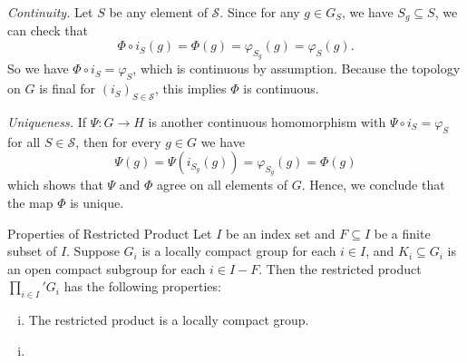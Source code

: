 \documentclass{report}
\begin{document}
\begin{prf}
\emph{Continuity.}
Let $S$ be any element of $\mathcal{S}$. Since for any $g\in G_{S}$, we have $S_g\subseteq S$, we can check that
\[
\Phi\circ i_S(g)=\Phi(g)=\varphi_{S_g}(g)=\varphi_S(g).
\]
So we have $\Phi\circ i_S=\varphi_S$, which is continuous by assumption. Because the topology on $G$ is final for $(i_S)_{S\in \mathcal{S}}$, this implies
$\Phi$ is continuous.

\emph{Uniqueness.}
If $\Psi\colon G\to H$ is another continuous homomorphism with
$\Psi\circ i_S=\varphi_S$ for all $S\in\mathcal{S}$, then for every $g\in G$ we have
\[
\Psi(g)=\Psi(i_{S_g}(g))=\varphi_{S_g}(g)=\Phi(g)
\]
which shows that $\Psi$ and $\Phi$ agree on all elements of $G$. Hence, we conclude that the map $\Phi$ is unique.
\end{prf}

\begin{proposition}{Properties of Restricted Product}{}
	Let \( I \) be an index set and \( F\subseteq I \) be a finite subset of \( I \). Suppose \( G_i \) is a locally compact group for each \( i \in I \), and \( K_i \subseteq G_i \) is an open compact subgroup for each \( i \in I - F \). Then the restricted product \( \prod_{i\in I}' G_i \) has the following properties:
	\begin{enumerate}[(i)]
		\item The restricted product is a locally compact group.
	\end{enumerate}
\end{proposition}
\begin{prf}
	\begin{enumerate}[(i)]
		\item 
	\end{enumerate}
\end{prf}
\end{document}
